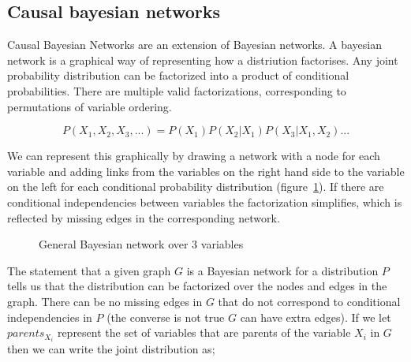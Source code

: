 \documentclass[11pt,a4paper,oneside]{book}
\begin{document}
\subsection*{Causal bayesian networks}

Causal Bayesian Networks are an extension of Bayesian networks. A bayesian network is a graphical way of representing how a distriution factorises. Any joint probability distribution can be factorized into a product of conditional probabilities. There are multiple valid factorizations, corresponding to permutations of variable ordering.

\begin{equation}
P(X_{1},X_{2},X_{3},...)=P(X_{1})P(X_{2}|X_{1})P(X_{3}|X_{1},X_{2})...
\end{equation}

We can represent this graphically by drawing a network with a node for each variable and adding links from the variables on the right hand side to the variable on the left for each conditional probability distribution (figure~\ref{fig:bayesnet}). If there are conditional independencies between variables the factorization simplifies, which is reflected by missing edges in the corresponding network. 

\begin{figure}[h]
\centering
\caption{General Bayesian network over 3 variables}
\label{fig:bayesnet}
\end{figure}

The statement that a given graph $G$ is a Bayesian network for a distribution $P$ tells us that the distribution can be factorized over the nodes and edges in the graph. There can be no missing edges in $G$ that do not correspond to conditional independencies in $P$ (the converse is not true $G$ can have extra edges). If we let $parents_{X_{i}}$ represent the set of variables that are parents of the variable $X_{i}$ in $G$ then we can write the joint distribution as; 
\end{document}
